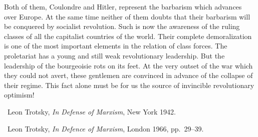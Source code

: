 Both of them, Coulondre and Hitler, represent the barbarism which advances over Europe. At the same time neither of them doubts that their barbarism will be conquered by socialist revolution. Such is now the awareness of the ruling classes of all the capitalist countries of the world. Their complete demoralization is one of the most important elements in the relation of class forces. The proletariat has a young and still weak revolutionary leadership. But the leadership of the bourgeoisie rots on its feet. At the very outset of the war which they could not avert, these gentlemen are convinced in advance of the collapse of their regime. This fact alone must be for us the source of invincible revolutionary optimism!

\enlargethispage{1 \baselineskip}
\begin{letterinfo}
  \firstpublished\ Leon Trotsky, \emph{In Defense of Marxism}, New York 1942.
  
  \checkedagainst\ Leon Trotsky, \emph{In Defence of Marxism}, London 1966, pp.~29--39.
\end{letterinfo}